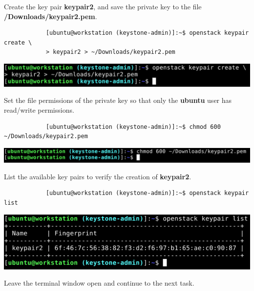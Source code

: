 \documentclass[letterpaper, 12pt]{article}
\begin{document}
\begin{enumerate}
    \begin{labstep}
        Create the key pair \textbf{keypair2}, and save the private key to the file
        \textbf{\texttildemid/Downloads/keypair2.pem}.
        \begin{lstlisting}
            [ubuntu@workstation (keystone-admin)]:~$ openstack keypair create \
            > keypair2 > ~/Downloads/keypair2.pem
        \end{lstlisting}

        \begin{center}
            \includegraphics[width=\linewidth]{images/part7/step10.png}
        \end{center}
    \end{labstep}

    \begin{labstep}
        Set the file permissions of the private key so that only the \textbf{ubuntu} user has read/write permissions.
        \begin{lstlisting}
            [ubuntu@workstation (keystone-admin)]:~$ chmod 600 ~/Downloads/keypair2.pem
        \end{lstlisting}

        \begin{center}
            \includegraphics[width=\linewidth]{images/part7/step11.png}
        \end{center}
    \end{labstep}

    \begin{labstep}
        List the available key pairs to verify the creation of \textbf{keypair2}.
        \begin{lstlisting}
            [ubuntu@workstation (keystone-admin)]:~$ openstack keypair list
        \end{lstlisting}

        \begin{center}
            \includegraphics[width=\linewidth]{images/part7/step12.png}
        \end{center}
    \end{labstep}

    \begin{labstep}
        Leave the terminal window open and continue to the next task.
    \end{labstep}

\end{enumerate}
\end{document}
